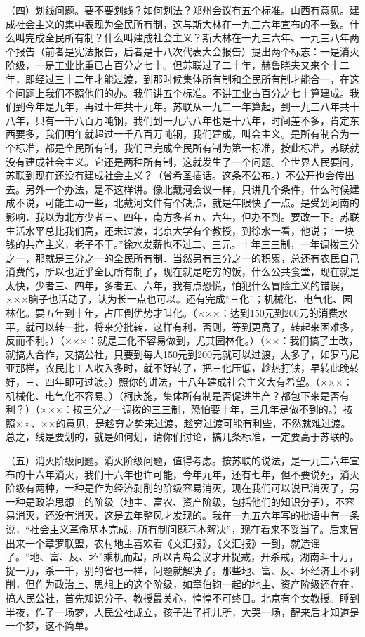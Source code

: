 （四）划线问题。要不要划线？如何划法？郑州会议有五个标准。山西有意见。建成社会主义的集中表现为全民所有制，这与斯大林在一九三六年宣布的不一致。什么叫完成全民所有制？什么叫建成社会主义？斯大林在一九三六年、一九三八年两个报告（前者是宪法报告，后者是十八次代表大会报告）提出两个标志：一是消灭阶级，一是工业比重已占百分之七十。但苏联过了二十年，赫鲁晓夫又来个十二年，即经过三十二年才能过渡，到那时候集体所有制和全民所有制才能合一，在这个问题上我们不照他们的办。我们讲五个标准。不讲工业占百分之七十算建成。我们到今年是九年，再过十年共十九年。苏联从一九二一年算起，到一九三八年共十八年，只有一千八百万吨钢，我们到一九六八年也是十八年，时间差不多，肯定东西要多，我们明年就超过一千八百万吨钢，我们建成，叫会主义。是所有制合为一个标准，都是全民所有制，我们已完成全民所有制为第一标准，按此标准，苏联就没有建成社会主义。它还是两种所有制，这就发生了一个问题。全世界人民要问，苏联到现在还没有建成社会主义？（曾希圣插话。这条不公布。）不公开也会传出去。另外一个办法，是不这样讲。像北戴河会议一样，只讲几个条件，什么时候建成不说，可能主动一些，北戴河文件有个缺点，就是年限快了一点。是受到河南的影响．我以为北方少者三、四年，南方多者五、六年，但办不到。要改一下。苏联生活水平总比我们高，还未过渡，北京大学有个教授，到徐水一看，他说；“一块钱的共产主义，老子不干。”徐水发薪也不过二、三元。十年三三制，一年调拨三分之一，那就是三分之一的全民所有制．当然另有三分之一的积累，总还有农民自己消费的，所以也近乎全民所有制了，现在就是吃穷的饭，什么公共食堂，现在就是太快，少者三、四年，多者五、六年，我有点恐慌，怕犯什么冒险主义的错误，×××脑子也活动了，认为长一点也可以。还有完成“三化”；机械化、电气化、园林化。要五年到十年，占压倒优势才叫化。（×××：达到150元到200元的消费水平，就可以转一批，将来分批转，这样有利，否则，等到更高了，转起来困难多，反而不利。）（×××：就是三化不容易做到，尤其园林化。）（××：我们搞了土改，就搞大合作，又搞公社，只要到每人150元到200元就可以过渡，太多了，如罗马尼亚那样，农民比工人收入多时，就不好转了，把三化压低，趁热打铁，早转此晚转好，三、四年即可过渡。）照你的讲法，十八年建成社会主义大有希望。（×××：机械化、电气化不容易。）（柯庆施，集体所有制是否促进生产？都包下来是否有利？）（×××：按三分之一调拨的三三制，恐怕要十年，三几年是做不到的。）按照××、××的意见，是趁穷之势来过渡，趁穷过渡可能有利些，不然就难过渡。总之，线是要划的，就是如何划，请你们讨论，搞几条标准，一定要高于苏联的。

（五）消灭阶级问题。消灭阶级问题，值得考虑。按苏联的说法，是一九三六年宣布的十六年消灭，我们十六年也许可能，今年九年，还有七年，但不要说死，消灭阶级有两种，一种是作为经济剥削的阶级容易消灭，现在我们可以说已消灭了，另一种是政治思想上的阶级（地主、富农、资产阶级，包括他们的知识分子），不容易消灭，还没有消灭，这是去年整风才发现的。我在一九五六年写的批语中有一条说，“社会主义革命基本完成，所有制问题基本解决”，现在看来不妥当了。后来冒出来一个章罗联盟，农村地主喜欢看《文汇报》，《文汇报》一到，就造谣了。“地、富、反、坏”乘机而起，所以青岛会议才开捉戒，开杀戒，湖南斗十万，捉一万，杀一千，别的省也一样，问题就解决了。那些地、富、反、坏经济上不剥削，但作为政治上、思想上的这个阶级，如章伯钧一起的地主、资产阶级还存在，搞人民公社，首先知识分子、教授最关心，惶惶不可终日。北京有个女教授。睡到半夜，作了一场梦，人民公社成立，孩子进了托儿所，大哭一场，醒来后才知道是一个梦，这不简单。

